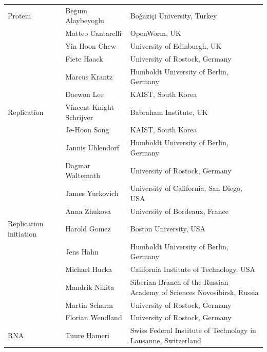 \documentclass[journal,transmag]{IEEEtran}
\begin{document}
\begin{table}[ht!]
\begin{tabularx}{\textwidth}{l||l||X}
Protein                & Begum Alaybeyoglu                & Bo\v{g}azi\c{c}i University, Turkey\\
                       & Matteo Cantarelli                & OpenWorm, UK\\
                       & Yin Hoon Chew                    & University of Edinburgh, UK\\
                       & Fiete Haack                      & University of Rostock, Germany\\
                       & Marcus Krantz                    & Humboldt University of Berlin, Germany\\
                       & Daewon Lee                       & KAIST, South Korea\\\hline
Replication            & Vincent Knight-Schrijver         & Babraham Institute, UK\\
                       & Je-Hoon Song                     & KAIST, South Korea\\
                       & Jannis Uhlendorf                 & Humboldt University of Berlin, Germany\\
                       & Dagmar Waltemath                 & University of Rostock, Germany\\
                       & James Yurkovich                  & University of California, San Diego, USA\\
                       & Anna Zhukova                     & University of Bordeaux, France\\\hline
Replication initiation & Harold Gomez                     & Boston University, USA\\
                       & Jens Hahn                        & Humboldt University of Berlin, Germany\\
                       & Michael Hucka                    & California Institute of Technology, USA\\
                       & Mandrik Nikita                   & Siberian Branch of the Russian Academy of Sciences Novosibirsk, Russia\\
                       & Martin Scharm                    & University of Rostock, Germany\\
                       & Florian Wendland                 & University of Rostock, Germany\\\hline
RNA                    & Tuure Hameri                     & Swiss Federal Institute of Technology in Lausanne, Switzerland\\

\end{tabularx}
\end{table}
\end{document}
